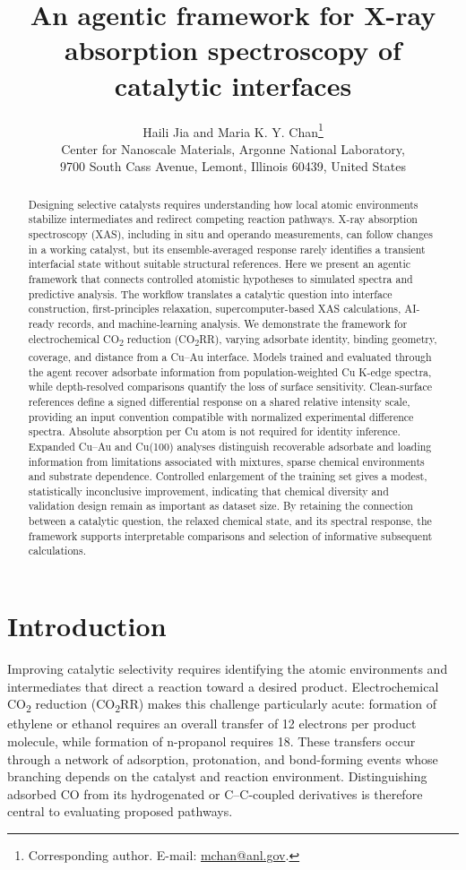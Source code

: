 \documentclass[11pt,a4paper]{article}
\title{An agentic framework for X-ray absorption spectroscopy of catalytic interfaces}
\author{Haili Jia and Maria K. Y. Chan\thanks{Corresponding author. E-mail: \href{mailto:mchan@anl.gov}{mchan@anl.gov}.}\\[0.6em]
\small Center for Nanoscale Materials, Argonne National Laboratory,\\
\small 9700 South Cass Avenue, Lemont, Illinois 60439, United States}
\date{}
\begin{document}
\maketitle
\begin{abstract}
Designing selective catalysts requires understanding how local atomic environments stabilize intermediates and redirect competing reaction pathways. X-ray absorption spectroscopy (XAS), including in situ and operando measurements, can follow changes in a working catalyst, but its ensemble-averaged response rarely identifies a transient interfacial state without suitable structural references. Here we present an agentic framework that connects controlled atomistic hypotheses to simulated spectra and predictive analysis. The workflow translates a catalytic question into interface construction, first-principles relaxation, supercomputer-based XAS calculations, AI-ready records, and machine-learning analysis. We demonstrate the framework for electrochemical CO\textsubscript{2} reduction (CO\textsubscript{2}RR), varying adsorbate identity, binding geometry, coverage, and distance from a Cu--Au interface. Models trained and evaluated through the agent recover adsorbate information from population-weighted Cu K-edge spectra, while depth-resolved comparisons quantify the loss of surface sensitivity. Clean-surface references define a signed differential response on a shared relative intensity scale, providing an input convention compatible with normalized experimental difference spectra. Absolute absorption per Cu atom is not required for identity inference. Expanded Cu--Au and Cu(100) analyses distinguish recoverable adsorbate and loading information from limitations associated with mixtures, sparse chemical environments and substrate dependence. Controlled enlargement of the training set gives a modest, statistically inconclusive improvement, indicating that chemical diversity and validation design remain as important as dataset size. By retaining the connection between a catalytic question, the relaxed chemical state, and its spectral response, the framework supports interpretable comparisons and selection of informative subsequent calculations.
\end{abstract}

\section{Introduction}
Improving catalytic selectivity requires identifying the atomic environments and intermediates that direct a reaction toward a desired product. Electrochemical CO\textsubscript{2} reduction (CO\textsubscript{2}RR) makes this challenge particularly acute: formation of ethylene or ethanol requires an overall transfer of 12 electrons per product molecule, while formation of n-propanol requires 18.\cite{ni2024,francis2018} These transfers occur through a network of adsorption, protonation, and bond-forming events whose branching depends on the catalyst and reaction environment. Distinguishing adsorbed CO from its hydrogenated or C--C-coupled derivatives is therefore central to evaluating proposed pathways.\cite{zhan2024,montoya2015}
\end{document}
